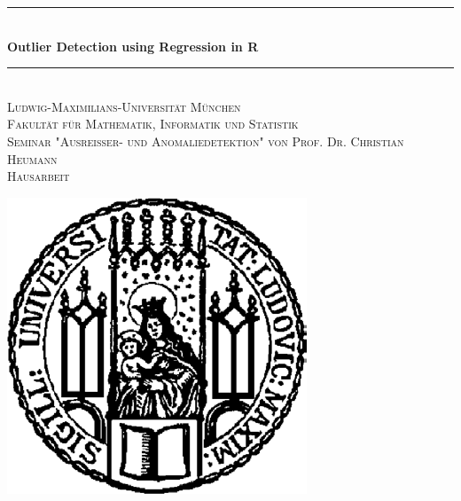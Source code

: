 \begin{titlepage}


\newcommand{\HRule}{\rule{\linewidth}{0.5mm}} %

\center %


\HRule \\[0.4cm]
{ \huge \bfseries Outlier Detection using Regression in R}\\[0.4cm] %
\HRule \\[1.5cm]


\textsc{\LARGE Ludwig-Maximilians-Universität München}\\[0.5cm] %
\textsc{\Large Fakultät für Mathematik, Informatik und Statistik}\\[1.5cm]


\textsc{\Large Seminar "Ausreißer- und Anomaliedetektion" von Prof. Dr. Christian Heumann}\\[0.5cm] %
\textsc{\large Hausarbeit}\\[0.5cm] %


\vfill

\includegraphics[height=0.2\textheight]{figs/sigill.png}\\[1cm] %




\end{titlepage}
